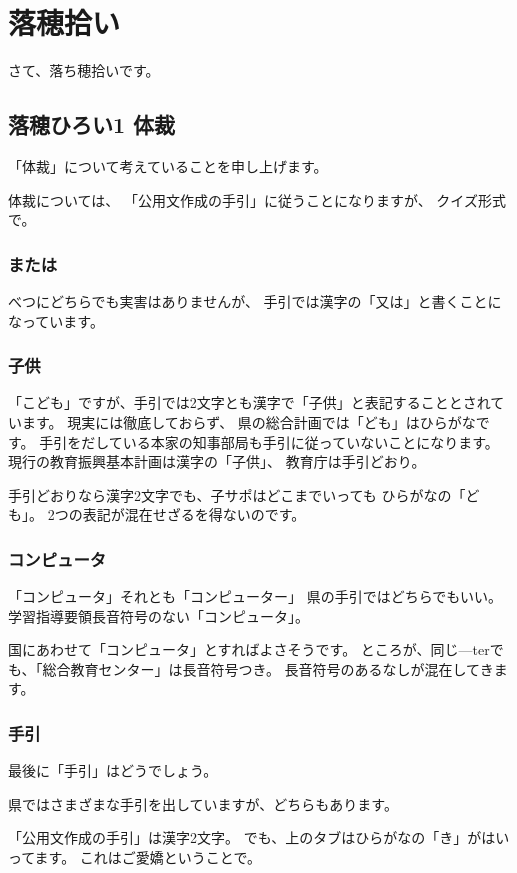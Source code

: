 \documentclass[uplatex,jis2004,dvipdfmx,14pt]{jsarticle}
\begin{document}
\newpage
\section{落穂拾い}

さて、落ち穂拾いです。

\subsection{落穂ひろい1 体裁}

「体裁」について考えていることを申し上げます。


体裁については、
「公用文作成の手引」に従うことになりますが、
クイズ形式で。

\subsubsection{または}
べつにどちらでも実害はありませんが、
手引では漢字の「又は」と書くことになっています。


\subsubsection{子供}
「こども」ですが、手引では2文字とも漢字で「子供」と表記することとされています。
現実には徹底しておらず、
県の総合計画では「ども」はひらがなです。
手引をだしている本家の知事部局も手引に従っていないことになります。
現行の教育振興基本計画は漢字の「子供」、
教育庁は手引どおり。

手引どおりなら漢字2文字でも、子サポはどこまでいっても
ひらがなの「ども」。
2つの表記が混在せざるを得ないのです。

\subsubsection{コンピュータ}
「コンピュータ」それとも「コンピューター」
県の手引ではどちらでもいい。
学習指導要領長音符号のない「コンピュータ」。

国にあわせて「コンピュータ」とすればよさそうです。
ところが、同じ---terでも、「総合教育センター」は長音符号つき。
長音符号のあるなしが混在してきます。

\subsubsection{手引}
最後に「手引」はどうでしょう。

県ではさまざまな手引を出していますが、どちらもあります。

「公用文作成の手引」は漢字2文字。
でも、上のタブはひらがなの「き」がはいってます。
これはご愛嬌ということで。
\end{document}
